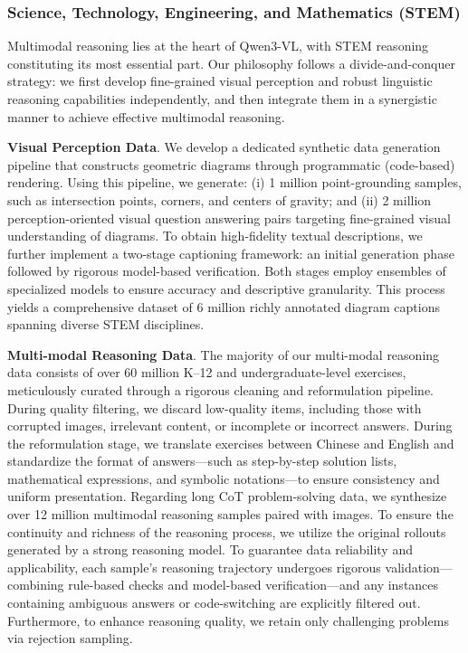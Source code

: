 \documentclass{article} %
\begin{document}
\subsubsection{Science, Technology, Engineering, and Mathematics (STEM)}

Multimodal reasoning lies at the heart of Qwen3-VL, with STEM reasoning constituting its most essential part. Our philosophy follows a divide-and-conquer strategy: we first develop fine-grained visual perception and robust linguistic reasoning capabilities independently, and then integrate them in a synergistic manner to achieve effective multimodal reasoning.


\textbf{Visual Perception Data}. We develop a dedicated synthetic data generation pipeline that constructs geometric diagrams through programmatic (code-based) rendering. Using this pipeline, we generate: (i) 1 million point-grounding samples, such as intersection points, corners, and centers of gravity; and (ii) 2 million perception-oriented visual question answering pairs targeting fine-grained visual understanding of diagrams. To obtain high-fidelity textual descriptions, we further implement a two-stage captioning framework: an initial generation phase followed by rigorous model-based verification. Both stages employ ensembles of specialized models to ensure accuracy and descriptive granularity. This process yields a comprehensive dataset of 6 million richly annotated diagram captions spanning diverse STEM disciplines. 

\textbf{Multi-modal Reasoning Data}. The majority of our multi-modal reasoning data consists of over 60 million K–12 and undergraduate-level exercises, meticulously curated through a rigorous cleaning and reformulation pipeline. During quality filtering, we discard low-quality items, including those with corrupted images, irrelevant content, or incomplete or incorrect answers. During the reformulation stage, we translate exercises between Chinese and English and standardize the format of answers—such as step-by-step solution lists, mathematical expressions, and symbolic notations—to ensure consistency and uniform presentation.  Regarding long CoT problem-solving data, we synthesize over 12 million multimodal reasoning samples paired with images. To ensure the continuity and richness of the reasoning process, we utilize the original rollouts generated by a strong reasoning model. To guarantee data reliability and applicability, each sample’s reasoning trajectory undergoes rigorous validation—combining rule-based checks and model-based verification—and any instances containing ambiguous answers or code-switching are explicitly filtered out. Furthermore, to enhance reasoning quality, we retain only challenging problems via rejection sampling. 
\end{document}
